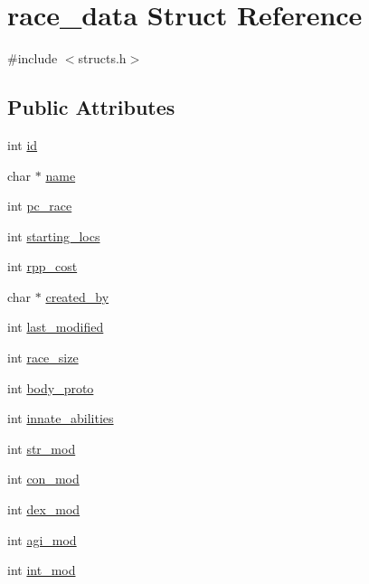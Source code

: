 \hypertarget{structrace__data}{\section{race\-\_\-data Struct Reference}
\label{structrace__data}
}


{\ttfamily \#include $<$structs.\-h$>$}

\subsection*{Public Attributes}
\begin{DoxyCompactItemize}
\item 
int \hyperlink{structrace__data_a6f8c072a841aab63306a3d4fc0905542}{id}
\item 
char $\ast$ \hyperlink{structrace__data_a917de6deb778c230eff5d8444f8ed7aa}{name}
\item 
int \hyperlink{structrace__data_a0dfa2673807e01a373cbe39a618700a8}{pc\-\_\-race}
\item 
int \hyperlink{structrace__data_ab225f9d9aa6815e5d0428bb4ab900bee}{starting\-\_\-locs}
\item 
int \hyperlink{structrace__data_a01615fc10681149548276b22fa437349}{rpp\-\_\-cost}
\item 
char $\ast$ \hyperlink{structrace__data_a8dcff32c7f876f3967f63113e18838da}{created\-\_\-by}
\item 
int \hyperlink{structrace__data_a787cb7f6d8c8670b5f379e87a758f570}{last\-\_\-modified}
\item 
int \hyperlink{structrace__data_a4e9ed7416fc29fe311de8a71a22c6542}{race\-\_\-size}
\item 
int \hyperlink{structrace__data_ad6be4549afc53e13750bb97785c41e1e}{body\-\_\-proto}
\item 
int \hyperlink{structrace__data_aabfad44caae33643060e721cb53a0120}{innate\-\_\-abilities}
\item 
int \hyperlink{structrace__data_ad535626e5de740a3eadb9abf3b76699b}{str\-\_\-mod}
\item 
int \hyperlink{structrace__data_ac8edc068374195f4e93251e812b02dfb}{con\-\_\-mod}
\item 
int \hyperlink{structrace__data_acb6428cfddaadf479490641c24531c0b}{dex\-\_\-mod}
\item 
int \hyperlink{structrace__data_a09bb642b42556523af54ac47af20a036}{agi\-\_\-mod}
\item 
int \hyperlink{structrace__data_a86ca5fa0f72e9f4426b153a8d8fcac70}{int\-\_\-mod}

\end{DoxyCompactItemize}
